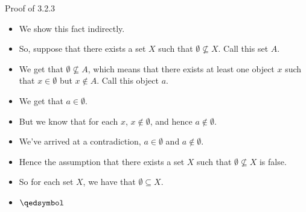 \documentclass[../slides.tex]{subfiles}
\begin{document}
\begin{frame}{Proof of 3.2.3}

	\begin{itemize}

		\item We show this fact indirectly. 
		
		\item So, suppose that there exists a set $X$ such that $\emptyset\nsubseteq X$. Call this set $A$. 
		
		\item We get that $\emptyset\nsubseteq A$, which means that there exists at least one object $x$ such that $x\in \emptyset$ but $x\notin A$. Call this object $a$. 
		
		\item We get that $a\in \emptyset$. 
		
		\item But we know that for each $x$, $x\notin \emptyset$, and hence $a\notin \emptyset$. 
		
		\item We've arrived at a contradiction, $a\in \emptyset$ and $a\notin\emptyset$. 
		
		\item Hence the assumption that there exists a set $X$ such that $\emptyset\nsubseteq X$ is false.
		
		\item So for each set $X$, we have that $\emptyset\subseteq X$.
		
		\item  $\qedsymbol$


\end{itemize}

\end{frame}
\end{document}
